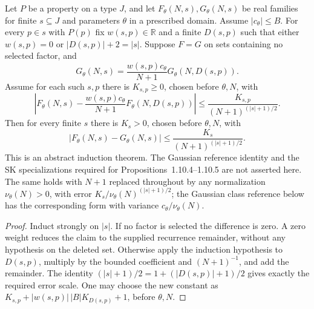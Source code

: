 \begin{theorem}
\label{thm:sg-tal:finite-moment-induction}
\leanok
{}
Let $P$ be a property on a type $J$, and let $F_\theta(N,s),G_\theta(N,s)$
be real families for finite $s\subseteq J$ and parameters $\theta$ in a prescribed domain.
Assume $|c_\theta|\le B$. For every $p\in s$ with $P(p)$ fix $w(s,p)\in\mathbb R$
and a finite $D(s,p)$ such that either $w(s,p)=0$ or $|D(s,p)|+2=|s|$.
Suppose $F=G$ on sets containing no selected factor, and
\[
 G_\theta(N,s)=\frac{w(s,p)c_\theta}{N+1}G_\theta(N,D(s,p)).
\]
Assume for each such $s,p$ there is $K_{s,p}\ge0$, chosen before $\theta,N$, with
\[
 \left|F_\theta(N,s)-\frac{w(s,p)c_\theta}{N+1}F_\theta(N,D(s,p))\right|
 \le\frac{K_{s,p}}{(N+1)^{(|s|+1)/2}}.
\]
Then for every finite $s$ there is $K_s>0$, chosen before $\theta,N$, with
\[
 |F_\theta(N,s)-G_\theta(N,s)|\le\frac{K_s}{(N+1)^{(|s|+1)/2}}.
\]
This is an abstract induction theorem. The Gaussian reference identity and the SK
specializations required for Propositions~1.10.4--1.10.5 are not asserted here.
The same holds with $N+1$ replaced throughout by any normalization $\nu_\theta(N)>0$, with error
$K_s/\nu_\theta(N)^{(|s|+1)/2}$; the Gaussian class reference below has the corresponding form with variance $c_\theta/\nu_\theta(N)$.
\end{theorem}
\begin{proof}
\leanok
Induct strongly on $|s|$. If no factor is selected the difference is zero.
A zero weight reduces the claim to the supplied recurrence remainder, without any
hypothesis on the deleted set. Otherwise apply the induction hypothesis to $D(s,p)$,
multiply by the bounded coefficient and $(N+1)^{-1}$, and add the remainder.
The identity $(|s|+1)/2=1+(|D(s,p)|+1)/2$ gives exactly the required error scale.
One may choose the new constant as
$K_{s,p}+|w(s,p)|\,|B|K_{D(s,p)}+1$, before $\theta,N$.
\end{proof}

